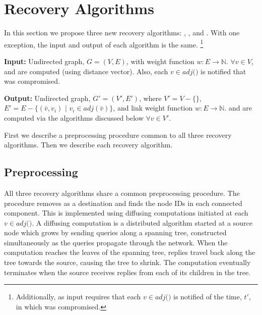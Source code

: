 \section{Recovery Algorithms}
\label{sec:algs}

In this section we propose three new recovery algorithms: \seconds, \purges, and \cprs.  
With one exception, the input and output of each algorithm is the same. 
{\footnote {\small Additionally, as input \cpr requires that each $v \in adj($\bads$)$ is notified of the time, $t'$, in which \bad was compromised.}}

{\bf Input:}  Undirected graph, $G=(V,E)$, with weight function $w: E \rightarrow \mathbb{N}$.  $\forall v \in V$,  \minvv and \dmatrixv are computed
(using distance vector). Also, each $v \in adj($\bads$)$ is notified that \bad was compromised.

{\bf Output:} Undirected graph, $G'=(V',E')$, where $V' = V -\{$\bads$\}$, $E'=E - \{(\bar{v},v_i)$ $|$ $v_i \in adj(\bar{v}) \}$,
and link weight function $w:E \rightarrow \mathbb{N}$.  \minvv and \dmatrixv are computed via the algorithms discussed below $\forall  v \in V'$. 

First we describe a preprocessing procedure common to all three recovery algorithms. Then we describe each recovery algorithm. 


\subsection{Preprocessing}
\label{subsec:preprocess}
All three recovery algorithms share a common preprocessing procedure.  The procedure removes \bad as a destination and finds the node IDs in each connected component. 
This is implemented using diffusing computations \cite{Dijkstra80} initiated at each $v \in adj($\bads$)$. 
A diffusing computation is a distributed algorithm started at a source
node which grows by sending queries along a spanning tree, constructed
simultaneously as the queries propagate through the network.  When the computation reaches the leaves
of the spanning tree, replies travel back along the tree towards the
source, causing the tree to shrink. The computation eventually terminates when the
source receives replies from each of its children in the tree. 

